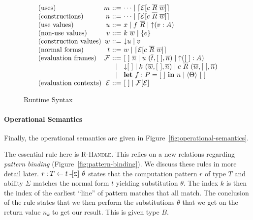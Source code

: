 \documentclass[msc,deptreport,cs]{infthesis} %
\makeatletter
\DeclarePairedDelimiter{\ceil}{\lceil}{\rceil}
\newcommand{\many}{\overline}
\newcommand\ba{\begin{array}}
\newcommand\ea{\end{array}}
\newenvironment{syntax}{\[\ba{@{}l@{~}r@{~}c@{~}l@{}}}{\ea\]\ignorespacesafterend}
\newcommand{\bindbase}[4]{{#3} \mathbin{:} {#2} \mathbin{#1} {#4}}
\newcommand{\adapt}{\Theta}
\newcommand{\sigs}{\Sigma}
\newcommand{\key}[1]{\mathbf{#1}} %
\newcommand{\thunk}[1]{\{{#1}\}}
\newcommand\slab[1]{(\textrm{#1})}
\newcommand{\effin}[1]{\langle {#1} \rangle}
\newcommand{\EC}{\mathcal{E}}
\newcommand{\EF}{\mathcal{F}}
\newcommand{\venv}{\theta}
\newcommand{\freeze}{\ceil}
\newcommand{\uc}{\mathord{\downarrow}}
\newcommand{\cu}{\mathord{\uparrow}}
\newcommand{\sigyields}[1]
           {\mathbin{\text{-\!-\!}[{\text{\scriptsize ${#1}$}}]\,}}
\newcommand{\bindsc}[5]{\bindbase{\sigyields{#4}}{#2 \leftarrow #3}{#1}{#5}}
\newcommand{\gor}{\mid}
\makeatother
\begin{document}
\begin{figure}[t]
\begin{syntax}
\slab{uses}                    & m   &::= & \dots \mid \freeze{\EC[c~\many{R}~\many{w}]} \\
\slab{constructions}           & n   &::= & \dots \mid \freeze{\EC[c~\many{R}~\many{w}]} \\
\slab{use values}              & u   &::= & x \gor f~\many{R} \gor \cu (v : A) \\
\slab{non-use values}          & v   &::= & k~\many{w} \gor \thunk{e} \\
\slab{construction values}     & w   &::= & \uc u \gor v \\
\slab{normal forms}            & t   &::= & w \gor \freeze{\EC[c~\many{R}~\many{w}]} \\
\slab{evaluation frames}       & \EF &::= & [~]~\many{n}
                                      \gor  u~(\many{t},[~],\many{n})
                                      \gor  \cu([~]:A) \\
                               &     &\gor& \uc [~]
                                      \gor  k~(\many{w},[~],\many{n})
                                      \gor  c~\many{R}~(\many{w},[~],\many{n}) \\
                               &     &\gor& \key{let}~f: P = [~]~\key{in}~n
                                      \gor \effin{\adapt}~[~] \\
\slab{evaluation contexts}     & \EC &::= & [~] \gor \EF[\EC] \\
\end{syntax}
\caption{Runtime Syntax}
\label{fig:runtime-syntax}
\end{figure}

\paragraph*{Operational Semantics} Finally, the operational semantics are given
in Figure~\ref{fig:operational-semantics}.

The essential rule here is \textsc{R-Handle}. This relies on a new relations
regarding \emph{pattern binding} (Figure~\ref{fig:pattern-binding}). We discuss
these rules in more detail later. $\bindsc{r}{T}{t}{\sigs}{\venv}$ states that
the computation pattern $r$ of type $T$ and ability $\sigs$ matches the normal
form $t$ yielding substitution $\venv$. The index $k$ is then the index of the
earliest ``line'' of pattern matches that all match. The conclusion of the rule
states that we then perform the substitutions $\many{\venv}$ that we get on the
return value $n_k$ to get our result. This is given type $B$.
\end{document}
